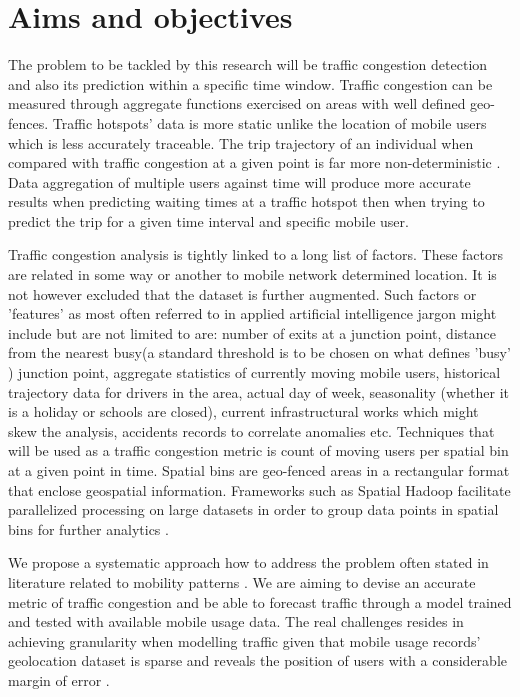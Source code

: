 \documentclass[12pt, a4paper]{report}
\theoremstyle{definition}
\theoremstyle{definition}%
\theoremstyle{definition}%
\theoremstyle{definition}%
\theoremstyle{definition}%
\theoremstyle{definition}%
\begin{document}
\section{Aims and objectives}

The problem to be tackled by this research will be traffic congestion detection and also its prediction within a specific time window. Traffic congestion can be measured through aggregate functions exercised on areas with well defined geo-fences. Traffic hotspots' data is more static unlike the location of mobile users which is less accurately traceable. The trip trajectory of an individual when compared with traffic congestion at a given point is far more non-deterministic \cite{Jarv2012}. Data aggregation of multiple users against time will produce more accurate results when predicting waiting times at a traffic hotspot then when trying to predict the trip for a given time interval and specific mobile user.

Traffic congestion analysis is tightly linked to a long list of factors. These factors are related in some way or another to mobile network determined location. It is not however excluded that the dataset is further augmented. Such factors or 'features' as most often referred to in applied artificial intelligence jargon might include but are not limited to are: number of exits at a junction point, distance from the nearest busy(a standard threshold is to be chosen on what defines 'busy' ) junction point, aggregate statistics of currently moving mobile users, historical trajectory data for drivers in the area, actual day of week, seasonality (whether it is a holiday or schools are closed), current infrastructural works which might skew the analysis, accidents records to correlate anomalies etc. Techniques that will be used as a traffic congestion metric is count of moving users per spatial bin at a given point in time\cite{Alarabi2014}. Spatial bins are geo-fenced areas in a rectangular format that enclose geospatial information. Frameworks such as Spatial Hadoop facilitate parallelized processing on large datasets in order to group data points in spatial bins for further analytics \cite{Alarabi2014}. 

We propose a systematic approach how to address the problem often stated in literature related to mobility patterns \cite{Calabrese2013,Toole2015,Hoteit2014,Alexander2015}. We are aiming to devise an accurate metric of traffic congestion and be able to forecast traffic through a model trained and tested with available mobile usage data. The real challenges resides in achieving granularity when modelling traffic given that mobile usage records' geolocation dataset is sparse and reveals the position of users with a considerable margin of error \cite{Hoteit2014,Gonzalez2008}.
\end{document}
